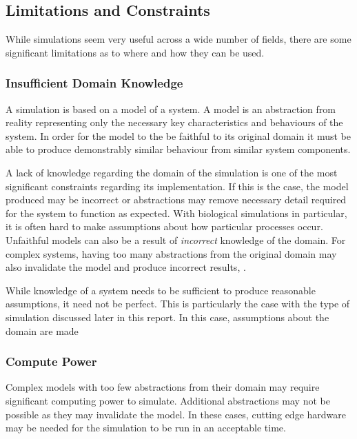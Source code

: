 \documentclass{UoYCSproject}
\begin{document}
\subsection{Limitations and Constraints}
While simulations seem very useful across a wide number of fields, there are some significant limitations as to where and how they can be used.

\subsubsection{Insufficient Domain Knowledge}
\label{domain_knowledge}
A simulation is based on a model of a system.
A model is an abstraction from reality representing only the necessary key characteristics and behaviours of the system.
In order for the model to the be faithful to its original domain it must be able to produce demonstrably similar behaviour from similar system components.

A lack of knowledge regarding the domain of the simulation is one of the most significant constraints regarding its implementation.
If this is the case, the model produced may be incorrect or abstractions may remove necessary detail required for the system to function as expected.
With biological simulations in particular, it is often hard to make assumptions about how particular processes occur\cite{stepney_abm}.
Unfaithful models can also be a result of \textit{incorrect} knowledge of the domain.
For complex systems, having too many abstractions from the original domain may also invalidate the model and produce incorrect results\cite[p.8]{cosmos}, \cite{stepney_abm}.

While knowledge of a system needs to be sufficient to produce reasonable assumptions, it need not be perfect.
This is particularly the case with the type of simulation discussed later in this report.
In this case, assumptions about the domain are made %

\subsubsection{Compute Power}
Complex models with too few abstractions from their domain may require significant computing power to simulate. Additional abstractions may not be possible as they may invalidate the model\cite{stepney_abm}.
In these cases, cutting edge hardware may be needed for the simulation to be run in an acceptable time. 
\end{document}
